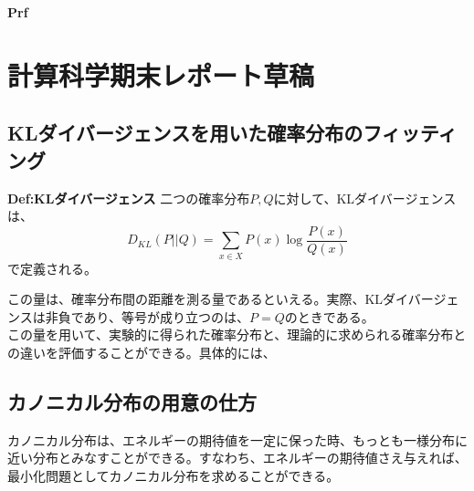 \documentclass[a4paper,11pt]{jsarticle}
\numberwithin{equation}{section}
\begin{document}
\textbf{Prf}\\

\section{計算科学期末レポート草稿}
\subsection{KLダイバージェンスを用いた確率分布のフィッティング}
\begin{itembox}[l]{\textbf{Def:KLダイバージェンス}}
  二つの確率分布$P,Q$に対して、KLダイバージェンスは、
  \begin{equation}
    D_{KL}(P||Q) = \sum_{x \in X} P(x) \log \frac{P(x)}{Q(x)}
  \end{equation}
  で定義される。
\end{itembox}
この量は、確率分布間の距離を測る量であるといえる。実際、KLダイバージェンスは非負であり、等号が成り立つのは、$P=Q$のときである。\\

この量を用いて、実験的に得られた確率分布と、理論的に求められる確率分布との違いを評価することができる。具体的には、

\subsection{カノニカル分布の用意の仕方}
カノニカル分布は、エネルギーの期待値を一定に保った時、もっとも一様分布に近い分布とみなすことができる。すなわち、エネルギーの期待値さえ与えれば、最小化問題としてカノニカル分布を求めることができる。\\
\end{document}

